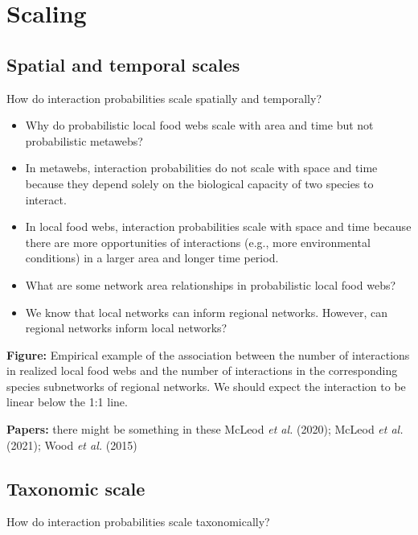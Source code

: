 \documentclass[10pt,oneside]{article}
\begin{document}
\hypertarget{scaling}{%
\section{Scaling}\label{scaling}}

\hypertarget{spatial-and-temporal-scales}{%
\subsection{Spatial and temporal
scales}\label{spatial-and-temporal-scales}}

How do interaction probabilities scale spatially and temporally?

\begin{itemize}
\tightlist
\item
  Why do probabilistic local food webs scale with area and time but not
  probabilistic metawebs?
\item
  In metawebs, interaction probabilities do not scale with space and
  time because they depend solely on the biological capacity of two
  species to interact.
\item
  In local food webs, interaction probabilities scale with space and
  time because there are more opportunities of interactions (e.g., more
  environmental conditions) in a larger area and longer time period.
\item
  What are some network area relationships in probabilistic local food
  webs?
\item
  We know that local networks can inform regional networks. However, can
  regional networks inform local networks?
\end{itemize}

\textbf{Figure:} Empirical example of the association between the number
of interactions in realized local food webs and the number of
interactions in the corresponding species subnetworks of regional
networks. We should expect the interaction to be linear below the 1:1
line.

\textbf{Papers:} there might be something in these McLeod \emph{et al.}
(2020); McLeod \emph{et al.} (2021); Wood \emph{et al.} (2015)

\hypertarget{taxonomic-scale}{%
\subsection{Taxonomic scale}\label{taxonomic-scale}}

How do interaction probabilities scale taxonomically?
\end{document}
